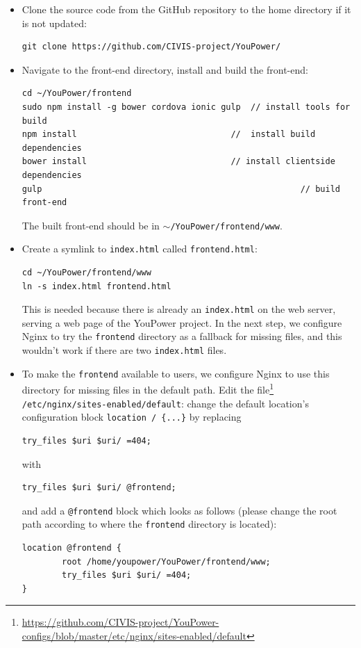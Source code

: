 \begin{itemize}

\item Clone the source code from the GitHub repository to the home directory if it is not updated: 
\begin{lstlisting}
git clone https://github.com/CIVIS-project/YouPower/ 
\end{lstlisting}

\item Navigate to the front-end directory, install and build the front-end: 
\begin{lstlisting}
cd ~/YouPower/frontend
sudo npm install -g bower cordova ionic gulp  // install tools for build
npm install                               //  install build dependencies
bower install                             // install clientside dependencies
gulp 									  				// build front-end
\end{lstlisting}
The built front-end should be in \texttt{\small $\sim$/YouPower/frontend/www}.

\item  Create a symlink to \texttt{\small index.html} called \texttt{\small frontend.html}:
\begin{lstlisting}
cd ~/YouPower/frontend/www
ln -s index.html frontend.html
\end{lstlisting}
This is needed because there is already an \texttt{\small index.html} on the web server, serving a web page of the YouPower project. In the next step, we configure Nginx to try the \texttt{\small frontend} directory as a fallback for missing files, and this wouldn't work if there are two \texttt{\small index.html} files. 

\item To make the \texttt{\small frontend} available to users, we configure Nginx to use this directory for missing files in the default path. Edit the file\footnote{\url{https://github.com/CIVIS-project/YouPower-configs/blob/master/etc/nginx/sites-enabled/default}} \texttt{\small /etc/nginx/sites-enabled/default}: change the default location's configuration block \texttt{\small location / \{...\}} by replacing
\begin{lstlisting}
try_files $uri $uri/ =404;
\end{lstlisting}
with 
\begin{lstlisting}
try_files $uri $uri/ @frontend;
\end{lstlisting} 

and add a \texttt{\small @frontend} block which looks as follows (please change the root path according to where the \texttt{\small frontend} directory is located):
\begin{lstlisting}
location @frontend {
        root /home/youpower/YouPower/frontend/www;
        try_files $uri $uri/ =404;
}
\end{lstlisting} 


\end{itemize}
